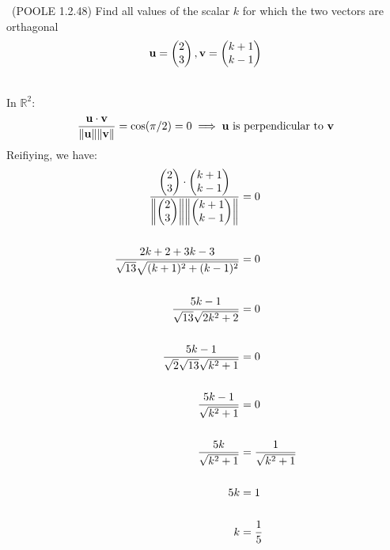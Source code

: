 \begin{problem}{\problemnum \, \textsf{(POOLE 1.2.48)}}
    Find all values of the scalar $k$ for which the two
    vectors are orthagonal
    \[ \mathbf{u} = \begin{pmatrix} 2 \\ 3\end{pmatrix},
        \mathbf{v} = \begin{pmatrix} k + 1 \\ k - 1\end{pmatrix}
    \]
\end{problem}
\begin{solution}\\
    In $\mathbb{R}^2$:
    \[ \frac{\bu \cdot \bv}
            {\norm*{\bu} \norm*{\bv}}
        = \cos(\pi/2)
        = 0
        \implies \bu \text{ is perpendicular to } \bv
    \]
    Reifiying, we have:
    \begin{align*}
        \frac{\vect{2}{3} \cdot \vect{k+1}{k-1}}
             {\norm*{\vect{2}{3}}\norm*{\vect{k+1}{k-1}}} &= 0
        \\\\
        \frac{2k + 2 + 3k - 3}
             {\sqrt{13}\sqrt{(k + 1)^{2} + (k - 1)^{2}}} &= 0
        \\\\
        \frac{5k - 1}
             { \sqrt{13}\sqrt{2k^{2} + 2}} &= 0
        \\\\
        \frac{5k - 1}
             {\sqrt{2}\sqrt{13}\sqrt{k^2 + 1}} &= 0
        \\\\
        \frac{5k - 1}
             {\sqrt{k^2 + 1}} &= 0
        \\\\
        \frac{5k}{\sqrt{k^2 + 1}}
        &=
        \frac{1}{\sqrt{k^2 + 1}}
        \\\\
        5k &= 1
        \\\\
        k &= \frac{1}{5}
    \end{align*}
\end{solution}
